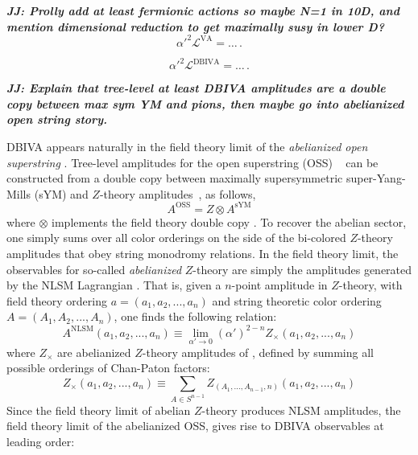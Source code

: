 \documentclass[12pt,letter]{article}
\def\dj#1{{\color{NUpurple}\it \bf JJ: #1}}
\begin{document}
\dj{Prolly add at least fermionic actions so maybe N=1 in 10D, and mention dimensional reduction to get maximally susy in lower D?}
\begin{equation}
 \label{vaLag}
  \alpha'^2\mathcal{L}^{\text{VA}} =\ldots
  \,.
\end{equation}


\begin{equation}
 \label{dbivaLag}
    \alpha'^2\mathcal{L}^{\text{DBIVA}} =\ldots
  \,.
\end{equation}

\dj{Explain that tree-level at least DBIVA amplitudes are  a double copy between max sym YM and pions, then maybe go into abelianized open string story. }


   DBIVA appears naturally in the field theory limit of the \textit{abelianized open superstring} \cite{Green:1982sw}. Tree-level amplitudes for the open superstring (OSS) ~\cite{Mafra:2011nv,Mafra:2011nw}  can be constructed from a double copy \cite{Broedel:2013tta} between maximally supersymmetric super-Yang-Mills (sYM) and $Z$-theory amplitudes~\cite{Carrasco:2016ldy,Carrasco:2016ygv,Mafra:2016mcc}, as follows,
\begin{equation}
A^{\text{OSS}}= Z \otimes A^{ \text{sYM}}
\end{equation}
where $\otimes$ implements the field theory double copy \cite{KLT, BCJ}. To recover the abelian sector, one simply sums over all color orderings on the side of the bi-colored $Z$-theory amplitudes that obey string monodromy relations. In the field theory limit, the observables for so-called \textit{abelianized} $Z$-theory are simply the amplitudes generated by the NLSM Lagrangian \cite{Carrasco:2016ldy}. That is, given a $n$-point amplitude in $Z$-theory, with field theory ordering $a=(a_1,a_2,...,a_n)$ and string theoretic color ordering $A=(A_1,A_2,...,A_n)$, one finds the following relation:
\begin{equation}
A^{\text{NLSM}}{(a_1,a_2,...,a_n)} \equiv \lim_{\alpha' \to 0} (\alpha')^{2-n}  Z_{\times}{(a_1,a_2,...,a_n)}
\end{equation}
where $Z_{\times}$ are abelianized $Z$-theory amplitudes of \cite{Carrasco:2016ldy}, defined by summing all possible orderings of Chan-Paton factors:
\begin{equation}
Z_{\times}(a_1,a_2,...,a_n)\equiv \sum_{A \in S^{n-1}} Z_{(A_1,...,A_{n-1},n)}{(a_1,a_2,...,a_n)}
\end{equation}
Since the field theory limit of abelian $Z$-theory produces NLSM amplitudes, the field theory limit of the abelianized OSS, gives rise to DBIVA observables at leading order:
\end{document}
